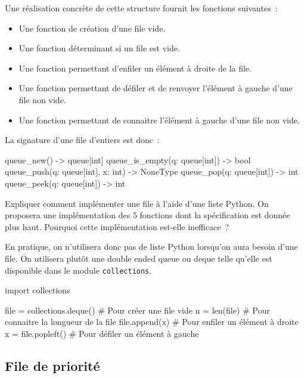 \documentclass{magnoliaold}
\begin{document}
Une réalisation concrète de cette structure fournit les
fonctions suivantes~:
\begin{itemize}
\item Une fonction de création d'une file vide.
\item Une fonction déterminant si un file est vide.
\item Une fonction permettant d'enfiler un élément à droite de la file.
\item Une fonction permettant de défiler et de renvoyer l'élément à gauche d'une file non vide.
\item Une fonction permettant de connaitre l'élément à gauche d'une file non vide.
\end{itemize}
La signature d'une file d'entiers est donc~:
\begin{pythoncode}
queue_new() -> queue[int]
queue_is_empty(q: queue[int]) -> bool
queue_push(q: queue[int], x: int) -> NoneType
queue_pop(q: queue[int]) -> int
queue_peek(q: queue[int]) -> int
\end{pythoncode}
\begin{exoUnique}
\exo Expliquer comment implémenter une file à l'aide d'une liste Python. On proposera une
  implémentation des 5 fonctions dont la spécification est donnée plus haut. Pourquoi cette
  implémentation est-elle inefficace~?
\end{exoUnique}

\vspace{2ex}
En pratique, on n'utilisera donc pas de liste Python lorsqu'on aura besoin d'une
file. On utilisera plutôt une \og double ended queue \fg ou \og deque \fg telle
qu'elle est disponible dans le module \verb!collections!.

\begin{pythoncode}
import collections

file = collections.deque() # Pour créer une file vide
n = len(file)              # Pour connaitre la longueur de la file
file.append(x)             # Pour enfiler un élément à droite
x = file.popleft()         # Pour défiler un élément à gauche
\end{pythoncode}

\subsection{File de priorité}
\end{document}
